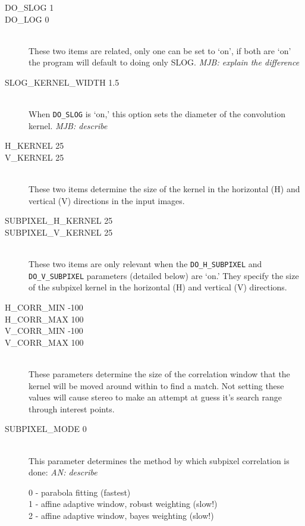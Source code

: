 \begin{description}

\item[DO\_SLOG 1]
\item[DO\_LOG 0] \hfill \\
  These two items are related, only one can be set to `on', if both
  are `on' the program will default to doing only SLOG.  \emph{MJB: explain the difference}
  
\item[SLOG\_KERNEL\_WIDTH 1.5] \hfill \\
  When \texttt{DO\_SLOG} is `on,' this option sets the diameter of
  the convolution kernel. \emph{MJB: describe}

\item[H\_KERNEL 25]
\item[V\_KERNEL 25] \hfill \\
These two items determine the size of the kernel in the horizontal (H) and vertical (V) directions in the input images.

\item[SUBPIXEL\_H\_KERNEL 25]
\item[SUBPIXEL\_V\_KERNEL 25] \hfill \\
These two items are only relevant when the \texttt{DO\_H\_SUBPIXEL} and \texttt{DO\_V\_SUBPIXEL} parameters (detailed below) are `on.'  They specify the size of the subpixel kernel in the horizontal (H) and vertical (V) directions.

\item[H\_CORR\_MIN -100]
\item[H\_CORR\_MAX 100]
\item[V\_CORR\_MIN -100]
\item[V\_CORR\_MAX 100] \hfill \\
These parameters determine the size of the correlation window that the kernel will be moved around within to find a match. Not setting these values will cause stereo to make an attempt at guess it's search range through interest points.

\item[SUBPIXEL\_MODE 0] \hfill \\
This parameter determines the method by which subpixel correlation is done:
\emph{AN: describe}
	\begin{description}
	\item[0 - parabola fitting (fastest)]
	\item[1 - affine adaptive window, robust weighting (slow!)]
	\item[2 - affine adaptive window, bayes weighting (slow!)]
	\end{description}


\end{description}
